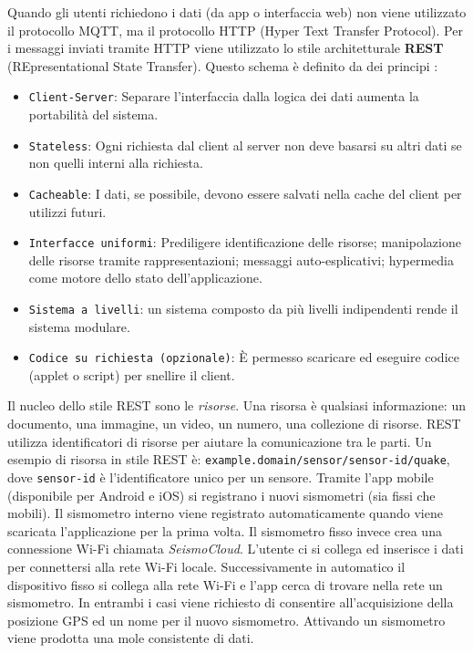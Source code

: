 \documentclass[a4paper,10pt]{memoir}
\begin{document}
Quando gli utenti richiedono i dati (da app o interfaccia web) non viene utilizzato il protocollo MQTT, ma il protocollo HTTP (Hyper Text Transfer Protocol).
Per i messaggi inviati tramite HTTP viene utilizzato lo stile architetturale \textbf{REST} (REpresentational State Transfer).
Questo schema è definito da dei principi \cite{rest}:
\begin{itemize}
  \item \texttt{Client-Server}: Separare l'interfaccia dalla logica dei dati aumenta la portabilità del sistema.
  \item \texttt{Stateless}: Ogni richiesta dal client al server non deve basarsi su altri dati se non quelli interni alla richiesta.
  \item \texttt{Cacheable}: I dati, se possibile, devono essere salvati nella cache del client per utilizzi futuri.
  \item \texttt{Interfacce uniformi}: Prediligere identificazione delle risorse; manipolazione delle risorse tramite rappresentazioni; messaggi auto-esplicativi; hypermedia come motore dello stato dell'applicazione.
  \item \texttt{Sistema a livelli}: un sistema composto da più livelli indipendenti rende il sistema modulare.
  \item \texttt{Codice su richiesta (opzionale)}: È permesso scaricare ed eseguire codice (applet o script) per snellire il client.
\end{itemize}
Il nucleo dello stile REST sono le \textit{risorse}.
Una risorsa è qualsiasi informazione: un documento, una immagine, un video, un numero, una collezione di risorse.
REST utilizza identificatori di risorse per aiutare la comunicazione tra le parti.
Un esempio di risorsa in stile REST è: \texttt{example.domain/sensor/sensor-id/quake}, dove \texttt{sensor-id} è l'identificatore unico per un sensore.
Tramite l'app mobile (disponibile per Android e iOS) si registrano i nuovi sismometri (sia fissi che mobili). Il sismometro interno viene registrato automaticamente quando viene scaricata l'applicazione per la prima volta. Il sismometro fisso invece crea una connessione Wi-Fi chiamata \textit{SeismoCloud}. L'utente ci si collega ed inserisce i dati per connettersi alla rete Wi-Fi locale. Successivamente in automatico il dispositivo fisso si collega alla rete Wi-Fi e l'app cerca di trovare nella rete un sismometro.
In entrambi i casi viene richiesto di consentire all'acquisizione della posizione GPS ed un nome per il nuovo sismometro.
Attivando un sismometro viene prodotta una mole consistente di dati.
\end{document}
